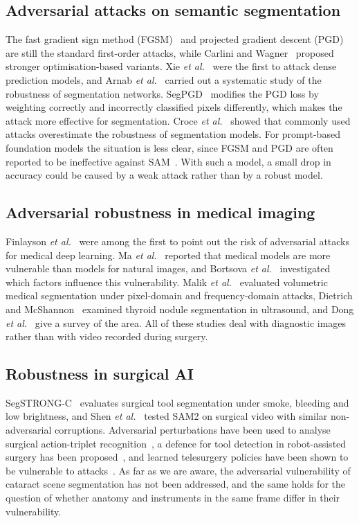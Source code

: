 \documentclass[conference]{IEEEtran}
\begin{document}
\subsection{Adversarial attacks on semantic segmentation}
The fast gradient sign method (FGSM)~\cite{goodfellow2015explaining} and projected gradient descent (PGD)~\cite{madry2018towards} are still the standard first-order attacks, while Carlini and Wagner~\cite{carlini2017towards} proposed stronger optimisation-based variants. Xie \emph{et al.}~\cite{xie2017adversarial} were the first to attack dense prediction models, and Arnab \emph{et al.}~\cite{arnab2018robustness} carried out a systematic study of the robustness of segmentation networks. SegPGD~\cite{gu2022segpgd} modifies the PGD loss by weighting correctly and incorrectly classified pixels differently, which makes the attack more effective for segmentation. Croce \emph{et al.}~\cite{croce2023reliable} showed that commonly used attacks overestimate the robustness of segmentation models. For prompt-based foundation models the situation is less clear, since FGSM and PGD are often reported to be ineffective against SAM~\cite{liu2024region}. With such a model, a small drop in accuracy could be caused by a weak attack rather than by a robust model.

\subsection{Adversarial robustness in medical imaging}
Finlayson \emph{et al.}~\cite{finlayson2018adversarial} were among the first to point out the risk of adversarial attacks for medical deep learning. Ma \emph{et al.}~\cite{ma2021understanding} reported that medical models are more vulnerable than models for natural images, and Bortsova \emph{et al.}~\cite{bortsova2021adversarial} investigated which factors influence this vulnerability. Malik \emph{et al.}~\cite{malik2024evaluating} evaluated volumetric medical segmentation under pixel-domain and frequency-domain attacks, Dietrich and McShannon~\cite{dietrich2026thyroid} examined thyroid nodule segmentation in ultrasound, and Dong \emph{et al.}~\cite{dong2023survey} give a survey of the area. All of these studies deal with diagnostic images rather than with video recorded during surgery.

\subsection{Robustness in surgical AI}
SegSTRONG-C~\cite{ding2024segstrongc} evaluates surgical tool segmentation under smoke, bleeding and low brightness, and Shen \emph{et al.}~\cite{shen2024sam2} tested SAM2 on surgical video with similar non-adversarial corruptions. Adversarial perturbations have been used to analyse surgical action-triplet recognition~\cite{cheng2022why}, a defence for tool detection in robot-assisted surgery has been proposed~\cite{khan2024guardian}, and learned telesurgery policies have been shown to be vulnerable to attacks~\cite{jin2026telesurgery}. As far as we are aware, the adversarial vulnerability of cataract scene segmentation has not been addressed, and the same holds for the question of whether anatomy and instruments in the same frame differ in their vulnerability.
\end{document}
